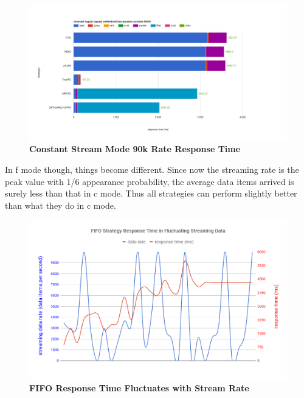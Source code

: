 \begin{figure}[!htbp]
	\centering
    \includegraphics[width=6.5in]{img/6-9wt.png}
    \caption{\textbf{Constant Stream Mode 90k Rate Response Time}}
    \label{fig:6-csmrrt9}
\end{figure}

In f mode though, things become different. 
Since now the streaming rate is the peak value with 1/6 appearance probability, the average data items arrived is surely less than that in c mode. 
Thus all strategies can perform slightly better than what they do in c mode. 

\begin{figure}[!htbp]
	\centering
    \includegraphics[width=5in]{img/6-fluctuating.png}
    \caption{\textbf{FIFO Response Time Fluctuates with Stream Rate}}
    \label{fig:6-fluc}
\end{figure}

